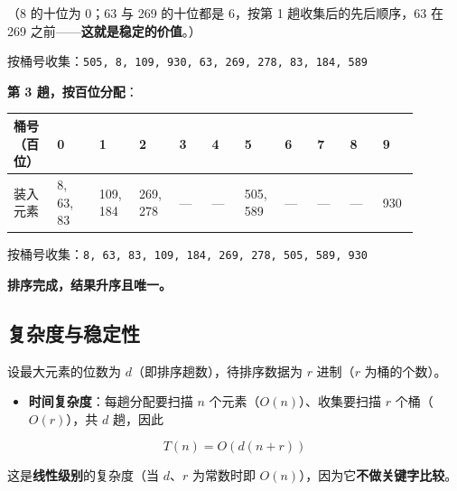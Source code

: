 \documentclass[11pt,openany,UTF8]{ctexbook}
\begin{document}
（8 的十位为 0；63 与 269 的十位都是 6，按第 1 趟收集后的先后顺序，63 在 269 之前——\textbf{这就是稳定的价值}。）

按桶号收集：\texttt{505,\allowbreak{} 8,\allowbreak{} 109,\allowbreak{} 930,\allowbreak{} 63,\allowbreak{} 269,\allowbreak{} 278,\allowbreak{} 83,\allowbreak{} 184,\allowbreak{} 589}

\textbf{第 3 趟，按百位分配}：

\begingroup\footnotesize\setlength{\tabcolsep}{2.0pt}
\begin{longtable}{@{}L{0.0932\linewidth}L{0.0932\linewidth}L{0.0839\linewidth}L{0.0839\linewidth}L{0.0746\linewidth}L{0.0746\linewidth}L{0.0839\linewidth}L{0.0746\linewidth}L{0.0746\linewidth}L{0.0746\linewidth}L{0.0746\linewidth}@{}}
\toprule
\textbf{桶号（百位）} & \textbf{0} & \textbf{1} & \textbf{2} & \textbf{3} & \textbf{4} & \textbf{5} & \textbf{6} & \textbf{7} & \textbf{8} & \textbf{9} \\
\midrule
\endhead
装入元素 & 8, 63, 83 & 109, 184 & 269, 278 & — & — & 505, 589 & — & — & — & 930 \\
\bottomrule
\end{longtable}
\endgroup

按桶号收集：\texttt{8,\allowbreak{} 63,\allowbreak{} 83,\allowbreak{} 109,\allowbreak{} 184,\allowbreak{} 269,\allowbreak{} 278,\allowbreak{} 505,\allowbreak{} 589,\allowbreak{} 930}

\textbf{排序完成，结果升序且唯一。}

\subsection{复杂度与稳定性}

设最大元素的位数为 $d$（即排序趟数），待排序数据为 $r$ 进制（$r$ 为桶的个数）。

\begin{itemize}
\item \textbf{时间复杂度}：每趟分配要扫描 $n$ 个元素（$O(n)$）、收集要扫描 $r$ 个桶（$O(r)$），共 $d$ 趟，因此
\end{itemize}
\[T(n)=O(d(n+r))\]

这是\textbf{线性级别}的复杂度（当 $d$、$r$ 为常数时即 $O(n)$），因为它\textbf{不做关键字比较}。
\end{document}
